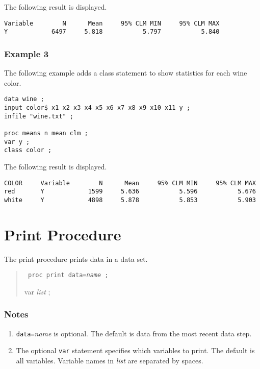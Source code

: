 \documentclass[12pt]{article}
\begin{document}
The following result is displayed.

{\footnotesize\begin{verbatim}
Variable        N      Mean     95% CLM MIN     95% CLM MAX
Y            6497     5.818           5.797           5.840
\end{verbatim}}

\subsubsection*{Example 3}

The following example adds a class statement
to show statistics for each wine color.

{\footnotesize\begin{verbatim}
data wine ;
input color$ x1 x2 x3 x4 x5 x6 x7 x8 x9 x10 x11 y ;
infile "wine.txt" ;

proc means n mean clm ;
var y ;
class color ;
\end{verbatim}}

The following result is displayed.

{\footnotesize\begin{verbatim}
COLOR     Variable        N      Mean     95% CLM MIN     95% CLM MAX
red       Y            1599     5.636           5.596           5.676
white     Y            4898     5.878           5.853           5.903
\end{verbatim}}

\newpage

\section{Print Procedure}

The print procedure prints data in a data set.

\begin{quote}
{\tt
proc print data={\it name} ;

var {\it list} ;
}
\end{quote}

\subsubsection*{Notes}

\begin{enumerate}
\item
{\tt data=}{\it name} is optional.
The default is data from the most recent data step.
\item
The optional {\tt var} statement specifies which variables
to print.
The default is all variables.
Variable names in {\it list} are separated by spaces.
\end{enumerate}
\end{document}
